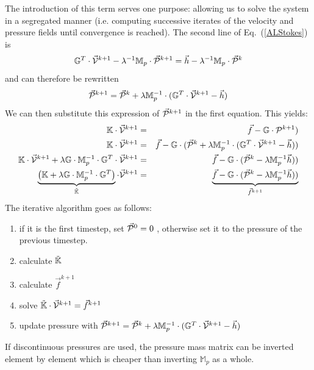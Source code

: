 The introduction of this term serves one purpose: allowing us to solve the system in a segregated manner (i.e. computing successive iterates of the velocity and pressure fields until convergence is reached).
The second line of Eq.~(\ref{ALStokes}) is 
\[
{\mathbb{G}}^T \cdot \vec{\cal V}^{k+1} - \lambda^{-1} \mathbb{M}_p \cdot \vec{\cal P}^{k+1} = \vec{h} - \lambda^{-1} \mathbb{M}_p \cdot \vec{\cal P}^k
\]
and can therefore be rewritten
\[
\vec{\cal P}^{k+1} = \vec{\cal P}^k + \lambda \mathbb{M}_p^{-1} \cdot ({\mathbb{G}}^T \cdot \vec{\cal V}^{k+1} - \vec h)
\]
We can then substitute this expression of $\vec{\cal P}^{k+1}$ in the first equation. This yields:
\begin{eqnarray}
{\mathbb{K}} \cdot \vec{\cal V}^{k+1}  
&=& \vec f - {\mathbb{G}} \cdot {\cal P}^{k+1}) \\
{\mathbb{K}} \cdot \vec{\cal V}^{k+1}  
&=& \vec f - {\mathbb{G}} \cdot ( \vec{\cal P}^k + \lambda \mathbb{M}_p^{-1} \cdot  ({\mathbb{G}}^T \cdot \vec{\cal V}^{k+1} - \vec h)  ) \\
{\mathbb{K}} \cdot \vec{\cal V}^{k+1} + \lambda {\mathbb{G}} \cdot \mathbb{M}_p^{-1} \cdot {\mathbb{G}}^T \cdot \vec{\cal V}^{k+1} 
&=& \vec f - {\mathbb{G}} \cdot ( \vec{\cal P}^k - \lambda \mathbb{M}_p^{-1}\vec h)  ) \\
\underbrace{  \left(  {\mathbb{K}}  + \lambda {\mathbb{G}} \cdot \mathbb{M}_p^{-1} \cdot {\mathbb{G}}^T \right)   }_{\tilde{{\mathbb{K}}}  } \cdot \vec{\cal V}^{k+1} 
&=& \underbrace{ \vec f - {\mathbb{G}} \cdot ( \vec{\cal P}^k - \lambda \mathbb{M}_p^{-1}\vec h)  )}_{\vec{f}^{k+1}} \\
\end{eqnarray}
The iterative algorithm goes as follows:
\begin{mdframed}[backgroundcolor=blue!5]
\begin{enumerate}
\item if it is the first timestep, set $\vec{\cal P}^0=0$ , otherwise set it to the pressure of the previous timestep.
\item calculate $\tilde{{\mathbb{K}}}$
\item calculate $\vec{f}^{k+1}$
\item solve $\tilde{{\mathbb{K}}} \cdot \vec{\cal V}^{k+1} = \vec{f}^{k+1}$
\item update pressure with 
$\vec{\cal P}^{k+1} = \vec{\cal P}^k + \lambda \mathbb{M}_p^{-1} \cdot ({\mathbb{G}}^T \cdot \vec{\cal V}^{k+1} - \vec h)$
\end{enumerate}
\end{mdframed}

\begin{remark} 
If discontinuous pressures are used, the pressure mass matrix can be inverted element by element which is 
cheaper than inverting $\mathbb{M}_p$ as a whole.
\end{remark}

